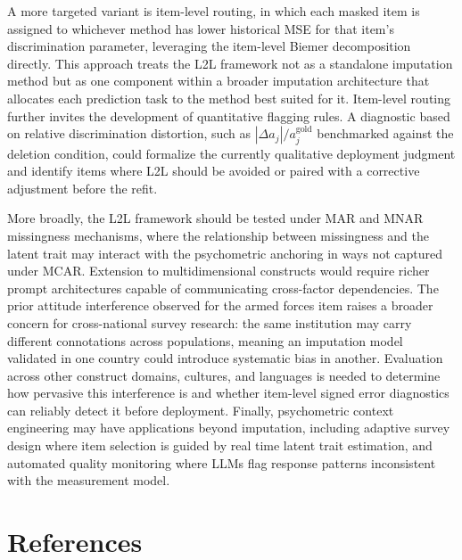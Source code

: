 \documentclass[
  man,
  floatsintext,
  longtable,
  nolmodern,
  notxfonts,
  notimes,
  colorlinks=true,linkcolor=blue,citecolor=blue,urlcolor=blue]{apa7}
\begin{document}
A more targeted variant is item-level routing, in which each masked item
is assigned to whichever method has lower historical MSE for that item's
discrimination parameter, leveraging the item-level Biemer decomposition
directly. This approach treats the L2L framework not as a standalone
imputation method but as one component within a broader imputation
architecture that allocates each prediction task to the method best
suited for it. Item-level routing further invites the development of
quantitative flagging rules. A diagnostic based on relative
discrimination distortion, such as \(|\Delta a_j| / a_j^{\text{gold}}\)
benchmarked against the deletion condition, could formalize the
currently qualitative deployment judgment and identify items where L2L
should be avoided or paired with a corrective adjustment before the
refit.

More broadly, the L2L framework should be tested under MAR and MNAR
missingness mechanisms, where the relationship between missingness and
the latent trait may interact with the psychometric anchoring in ways
not captured under MCAR. Extension to multidimensional constructs would
require richer prompt architectures capable of communicating
cross-factor dependencies. The prior attitude interference observed for
the armed forces item raises a broader concern for cross-national survey
research: the same institution may carry different connotations across
populations, meaning an imputation model validated in one country could
introduce systematic bias in another. Evaluation across other construct
domains, cultures, and languages is needed to determine how pervasive
this interference is and whether item-level signed error diagnostics can
reliably detect it before deployment. Finally, psychometric context
engineering may have applications beyond imputation, including adaptive
survey design where item selection is guided by real time latent trait
estimation, and automated quality monitoring where LLMs flag response
patterns inconsistent with the measurement model.

\newpage

\section{References}\label{references}
\end{document}
